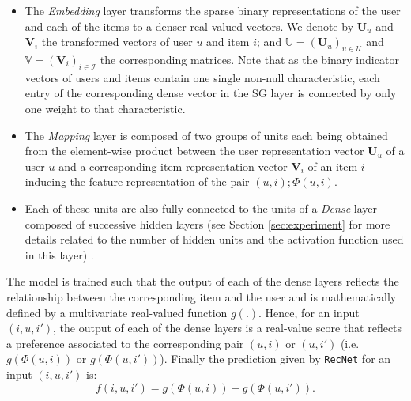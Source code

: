 \documentclass[10pt,journal,compsoc]{IEEEtran}
\newcommand{\userS}{\mathcal{U}}
\newcommand{\itemS}{\mathcal{I}}
\newcommand{\vecU}{\mathbf{U}}
\newcommand{\vecI}{\mathbf{V}}
\newcommand{\RecNet}{\texttt{RecNet}}
\begin{document}
\begin{sloppypar}
\begin{itemize}
   \item The {\it Embedding} layer transforms the sparse binary representations of the user and each of the items to a denser real-valued vectors. We denote by $\vecU_u$ and $\vecI_i$ the transformed vectors of user $u$ and item $i$; and $\mathbf{\mathbb{U}}=(\vecU_u)_{u\in\userS}$ and $\mathbf{\mathbb{V}}=(\vecI_i)_{i\in\itemS}$ the corresponding matrices. Note that as the binary indicator vectors of users and items contain one single non-null characteristic, each entry of the corresponding dense vector in the SG layer is connected by only one weight to that characteristic.
   \item The {\it Mapping} layer is composed of two groups of units each being obtained from the element-wise product between the user representation vector $\vecU_u$ of a user $u$ and a corresponding item representation vector $\vecI_i$ of an item $i$ inducing the feature representation of the pair $(u,i); \Phi(u,i)$.  %
    \item Each of these units are also fully connected to the units of a {\it Dense} layer composed of successive hidden layers (see Section \ref{sec:experiment} for more details related to the number of hidden units and the activation function used in this layer) .
\end{itemize}

The model is trained such that the output of each of the dense layers reflects the relationship between the corresponding item and the user and is mathematically defined by a multivariate real-valued function $g(.)$.
Hence, for an input $(i,u,i')$, the output of each of the dense layers is a real-value score that reflects a preference associated to the corresponding pair $(u,i)$ or $(u,i')$ (i.e. $g(\Phi(u,i))$ or $g(\Phi(u,i'))$). Finally the prediction given by {\RecNet} for an input $(i,u,i')$ is:
\begin{equation}
\label{eq:defF}
f(i,u,i')=g(\Phi(u,i))-g(\Phi(u,i')).
\end{equation}





\end{sloppypar}
\end{document}
